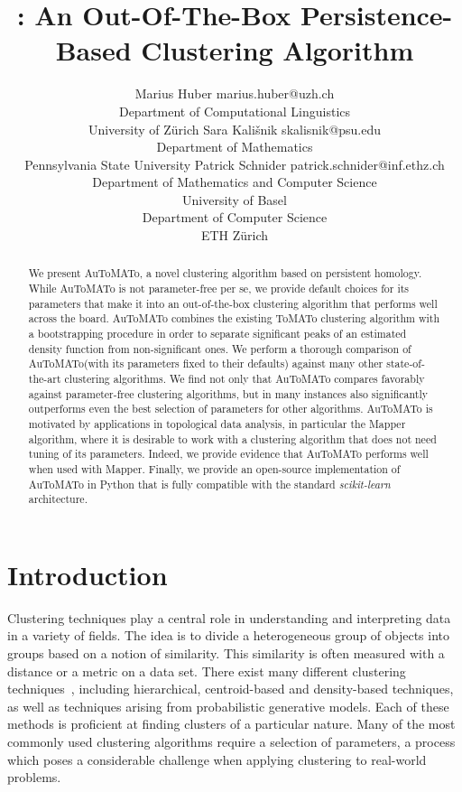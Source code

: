 \documentclass[10pt]{article} %
\title{\aut: An Out-Of-The-Box Persistence-Based Clustering Algorithm}
\author{\name Marius Huber \email marius.huber@uzh.ch \\
      \addr Department of Computational Linguistics \\
        University of Z\"{u}rich
      \AND
      \name Sara Kali\v{s}nik \email skalisnik@psu.edu \\
      \addr Department of Mathematics \\
        Pennsylvania State University
      \AND
      \name Patrick Schnider \email patrick.schnider@inf.ethz.ch \\
      \addr Department of Mathematics and Computer Science \\
        University of Basel \\
        Department of Computer Science \\
        ETH Z\"{u}rich}
\theoremstyle{plain}
\newcommand{\aut}{AuToMATo\xspace}
\newcommand{\tom}{ToMATo\xspace}
\begin{document}
\maketitle

\begin{abstract}
We present \aut, a novel clustering algorithm based on persistent homology. While \aut is not parameter-free per se, we provide default choices for its parameters that make it into an out-of-the-box clustering algorithm that performs well across the board. \aut combines the existing \tom clustering algorithm with a bootstrapping procedure in order to separate significant peaks of an estimated density function from non-significant ones. We perform a thorough comparison of \aut (with its parameters fixed to their defaults) against many other state-of-the-art clustering algorithms. We find not only that \aut compares favorably against parameter-free clustering algorithms, but in many instances also significantly outperforms even the best selection of parameters for other algorithms. \aut is motivated by applications in topological data analysis, in particular the Mapper algorithm, where it is desirable to work with a clustering algorithm that does not need tuning of its parameters. Indeed, we provide evidence that \aut performs well when used with Mapper. Finally, we provide an open-source implementation of \aut in Python that is fully compatible with the standard \emph{scikit-learn} architecture.
\end{abstract}



\section{Introduction}\label{sec:introduction}

Clustering techniques play a central role in understanding and interpreting data in a variety of fields. The idea is to divide a heterogeneous group of objects into groups based on a notion of similarity.  This similarity is often measured with a distance or a metric on a data set. 
There exist many different clustering techniques~\citep{clustering_textbook1, clustering_textbook2}, including hierarchical, centroid-based and density-based techniques, as well as techniques arising from probabilistic generative models. Each of these methods is proficient at finding clusters of a particular nature. 
Many of the most commonly used clustering algorithms require a selection of parameters, a process which poses a considerable challenge when applying clustering to real-world problems.
\end{document}
